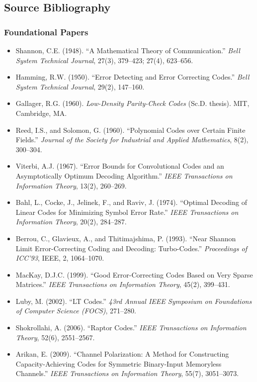 \documentclass[11pt,letterpaper]{article}
\begin{document}
\subsection{Source Bibliography}

\subsubsection{Foundational Papers}

\begin{itemize}[leftmargin=*]
  \item Shannon, C.E. (1948). ``A Mathematical Theory of Communication.'' \textit{Bell System Technical Journal}, 27(3), 379--423; 27(4), 623--656.
  \item Hamming, R.W. (1950). ``Error Detecting and Error Correcting Codes.'' \textit{Bell System Technical Journal}, 29(2), 147--160.
  \item Gallager, R.G. (1960). \textit{Low-Density Parity-Check Codes} (Sc.D. thesis). MIT, Cambridge, MA.
  \item Reed, I.S., and Solomon, G. (1960). ``Polynomial Codes over Certain Finite Fields.'' \textit{Journal of the Society for Industrial and Applied Mathematics}, 8(2), 300--304.
  \item Viterbi, A.J. (1967). ``Error Bounds for Convolutional Codes and an Asymptotically Optimum Decoding Algorithm.'' \textit{IEEE Transactions on Information Theory}, 13(2), 260--269.
  \item Bahl, L., Cocke, J., Jelinek, F., and Raviv, J. (1974). ``Optimal Decoding of Linear Codes for Minimizing Symbol Error Rate.'' \textit{IEEE Transactions on Information Theory}, 20(2), 284--287.
  \item Berrou, C., Glavieux, A., and Thitimajshima, P. (1993). ``Near Shannon Limit Error-Correcting Coding and Decoding: Turbo-Codes.'' \textit{Proceedings of ICC'93}, IEEE, 2, 1064--1070.
  \item MacKay, D.J.C. (1999). ``Good Error-Correcting Codes Based on Very Sparse Matrices.'' \textit{IEEE Transactions on Information Theory}, 45(2), 399--431.
  \item Luby, M. (2002). ``LT Codes.'' \textit{43rd Annual IEEE Symposium on Foundations of Computer Science (FOCS)}, 271--280.
  \item Shokrollahi, A. (2006). ``Raptor Codes.'' \textit{IEEE Transactions on Information Theory}, 52(6), 2551--2567.
  \item Arikan, E. (2009). ``Channel Polarization: A Method for Constructing Capacity-Achieving Codes for Symmetric Binary-Input Memoryless Channels.'' \textit{IEEE Transactions on Information Theory}, 55(7), 3051--3073.
\end{itemize}
\end{document}
